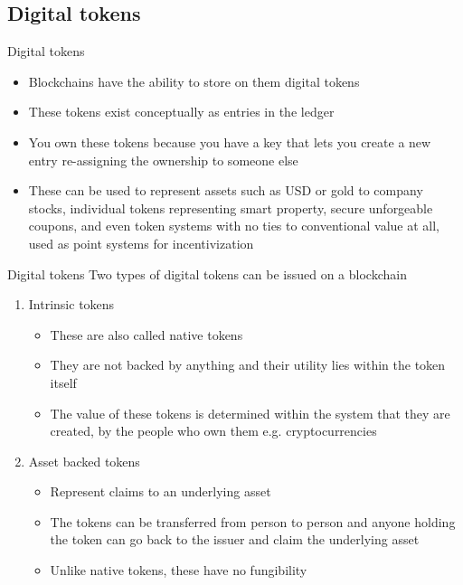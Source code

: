 \documentclass[9pt]{beamer}
\begin{document}
\subsection{Digital tokens}

\begin{frame}{Digital tokens}
	\begin{itemize}
		\item Blockchains have the ability to store on them digital tokens
		\item These tokens exist conceptually as entries in the ledger
		\item You own these tokens because you have a key that lets you create a new entry re-assigning the ownership to someone else
		\item These can be used to represent assets such as USD or gold to company stocks, individual tokens representing smart property, secure unforgeable coupons, and even token systems with no ties to conventional value at all, used as point systems for incentivization
	\end{itemize}
\end{frame}


\begin{frame}{Digital tokens}
	Two types of digital tokens can be issued on a blockchain
	\begin{enumerate}
		\item Intrinsic tokens
			\begin{itemize}
				\item These are also called native tokens
				\item They are not backed by anything and their utility lies within the token itself
				\item The value of these tokens is determined within the system that they are created, by the people who own them e.g. cryptocurrencies
			\end{itemize}
		\item Asset backed tokens
			\begin{itemize}
				\item Represent claims to an underlying asset
				\item The tokens can be transferred from person to person and anyone holding the token can go back to the issuer and claim the underlying asset
				\item Unlike native tokens, these have no fungibility
			\end{itemize}
	\end{enumerate}
\end{frame}
\end{document}
